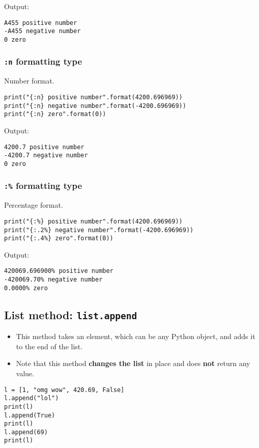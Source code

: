 \documentclass[11pt]{article}
\begin{document}
 \noindent Output:

\label{org6eeca01}
\begin{verbatim}
A455 positive number
-A455 negative number
0 zero
\end{verbatim}
\subsubsection{\texttt{:n} formatting type}
\label{sec:org3411e20}
Number format.

\begin{verbatim}
print("{:n} positive number".format(4200.696969))
print("{:n} negative number".format(-4200.696969))
print("{:n} zero".format(0))
\end{verbatim}

 \noindent Output:

\label{org1ecf047}
\begin{verbatim}
4200.7 positive number
-4200.7 negative number
0 zero
\end{verbatim}
\subsubsection{\texttt{:\%} formatting type}
\label{sec:org7c77edf}
Percentage format.

\begin{verbatim}
print("{:%} positive number".format(4200.696969))
print("{:.2%} negative number".format(-4200.696969))
print("{:.4%} zero".format(0))
\end{verbatim}

 \noindent Output:

\label{org452381b}
\begin{verbatim}
420069.696900% positive number
-420069.70% negative number
0.0000% zero
\end{verbatim}
\subsection{List method: \texttt{list.append}}
\label{sec:orge20b3f3}
\begin{itemize}
\item This method takes an element, which can be any Python object, and adds it to the end of the list.
\item Note that this method \textbf{changes the list} in place and does \textbf{not} return any value.
\end{itemize}
\begin{verbatim}
l = [1, "omg wow", 420.69, False]
l.append("lol")
print(l)
l.append(True)
print(l)
l.append(69)
print(l)
\end{verbatim}
\end{document}
